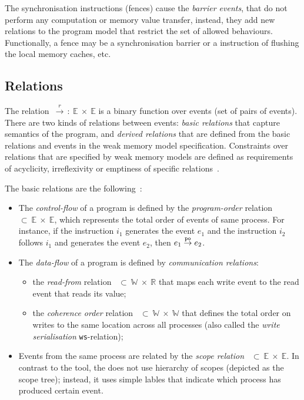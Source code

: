 The synchronisation instructions (fences) cause the \textit{barrier events}, that do not perform any computation or memory value transfer, instead, they add new relations to the program model that restrict the set of allowed behaviours.
Functionally, a fence may be a synchronisation barrier or a instruction of flushing the local memory caches, etc.


\subsection{Relations}
\label{ch:wmm:model:relations}


The relation~$\xrightarrow{r}\,:~\mathbb{E}~\times~\mathbb{E}$ is a binary function over events (set of pairs of events). There are two kinds of relations between events: \textit{basic relations} %
that capture semantics of the program, and \textit{derived relations} that are defined from the basic relations and events in the weak memory model specification. Constraints over relations that are specified by weak memory models are defined as requirements of acyclicity, irreflexivity or emptiness of specific relations~\cite{alglave2016syntax}.

\vspace{1em}
The basic relations are the following~\cite{alglave2010shared}:

\begin{itemize}
    \item The \textit{control-flow} of a program is defined by the \textit{program-order} relation \po~$\subset~\mathbb{E}~\times~\mathbb{E}$, which represents the total order of events of same process.
	For instance, if the instruction $i_1$ generates the event $e_1$ and the instruction $i_2$ follows $i_1$ and generates the event $e_2$, then $e_1 \overset{\mathtt{po}}{\rightarrow} e_2$.

    \item The \textit{data-flow} of a program is defined by \textit{communication relations}:
        \begin{itemize}[noitemsep]
            \item the \textit{read-from} relation \rf~$\subset~\mathbb{W}~\times~\mathbb{R}$ that maps each write event to the read event that reads its value;
            \item the \textit{coherence order} relation \co~$\subset~\mathbb{W}~\times~\mathbb{W}$ that defines the total order on writes to the same location across all processes         (also called the \textit{write serialisation} \texttt{ws}-relation);
        \end{itemize}

	\item Events from the same process are related by the \textit{scope relation} \sr~$\subset~\mathbb{E}~\times~\mathbb{E}$.
    In contrast to the  tool, the \mousquetaires does not use hierarchy of scopes (depicted as the scope tree); instead, it uses simple lables that indicate which process has produced certain event.
\end{itemize}

